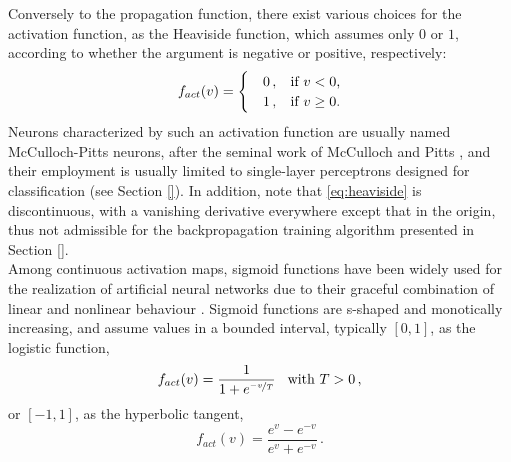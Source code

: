 \documentclass[11pt, a4paper]{report}
\theoremstyle{theorem}
\numberwithin{equation}{section}
\numberwithin{figure}{section}
\begin{document}
		Conversely to the propagation function, there exist various choices for the activation function, as the Heaviside function, which assumes only $0$ or $1$, according to whether the argument is negative or positive, respectively:
		\begin{equation}
			\label{eq:heaviside}
			f_{act}(v) = 
			\begin{cases}
				& 0 \, , \hspace*{0.3cm} \text{if $v < 0$,} \\
				& 1 \, , \hspace*{0.3cm} \text{if $v \geq 0$.}
			\end{cases}
		\end{equation}
		Neurons characterized by such an activation function are usually named McCulloch-Pitts neurons, after the seminal work of McCulloch and Pitts \cite{Hay05}, and their employment is usually limited to single-layer perceptrons designed for classification (see Section \ref{}). In addition, note that \eqref{eq:heaviside} is discontinuous, with a vanishing derivative everywhere except that in the origin, thus not admissible for the backpropagation training algorithm presented in Section \ref{}. \\
		Among continuous activation maps, sigmoid functions have been widely used for the realization of artificial neural networks due to their graceful combination of linear and nonlinear behaviour \cite{Hay05}. Sigmoid functions are s-shaped and monotically increasing, and assume values in a bounded interval, typically $[0,1]$, as the logistic function,
		\begin{equation}
			\label{eq:logistic}
			f_{act}(v) = \dfrac{1}{1 + e^{\nicefrac{-v}{T}}} \hspace*{0.3cm} \text{with $T > 0$} \, ,
		\end{equation}
		or $[-1,1]$, as the hyperbolic tangent,
		\begin{equation}
			\label{eq:hyperbolic-tangent}
			f_{act}(v) = \dfrac{e^{v} - e^{-v}}{e^v + e^{-v}} \, .
		\end{equation}
		
		\vspace*{0.3cm}
		
\end{document}
